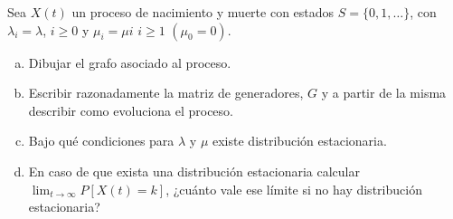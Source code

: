 \documentclass[twoside]{article}
\begin{document}
\newpage

\begin{ejercicio}{3}
Sea $X(t)$ un proceso de nacimiento y muerte con estados $S=\{0,1,\dotsc\}$, con $\lambda_i = \lambda$, $i\geq 0$ y $\mu_i = \mu i$ $i\geq 1$ $(\mu_0 = 0)$.
\begin{enumerate}[a)]
\item Dibujar el grafo asociado al proceso.
\item Escribir razonadamente la matriz de generadores, $G$ y a partir de la misma describir como evoluciona el proceso.
\item Bajo qué condiciones para $\lambda$ y $\mu$ existe distribución estacionaria.
\item En caso de que exista una distribución estacionaria calcular $\lim_{t\to \infty}P[X(t)=k]$, ¿cuánto vale ese límite si no hay distribución estacionaria?
\end{enumerate}
\end{ejercicio}
\end{document}
